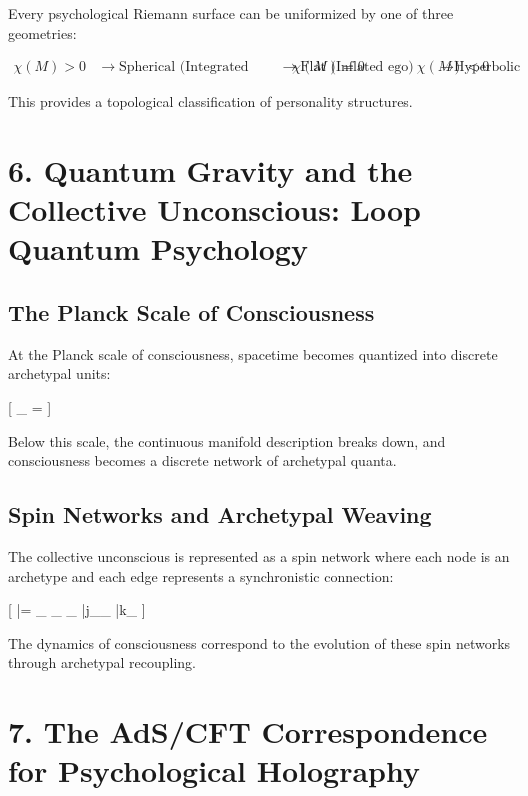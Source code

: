 \documentclass[12pt]{article}
\begin{document}
Every psychological Riemann surface can be uniformized by one of three geometries:

\begin{align}
\chi(M) > 0 &\rightarrow \text{Spherical (Integrated personality)} \
\chi(M) = 0 &\rightarrow \text{Flat (Inflated ego)} \
\chi(M) < 0 &\rightarrow \text{Hyperbolic (Neurotic fragmentation)}
\end{align}

This provides a topological classification of personality structures.

\section*{6. Quantum Gravity and the Collective Unconscious: Loop Quantum Psychology}

\subsection*{The Planck Scale of Consciousness}

At the Planck scale of consciousness, spacetime becomes quantized into discrete archetypal units:

[
\ell_{} =  \cdot {}
]

Below this scale, the continuous manifold description breaks down, and consciousness becomes a discrete network of archetypal quanta.

\subsection*{Spin Networks and Archetypal Weaving}

The collective unconscious is represented as a spin network where each node is an archetype and each edge represents a synchronistic connection:

[
|\rangle = \sum_{} \psi_{} \prod_{} |j_{}\rangle \prod_{} |k_{}\rangle
]

The dynamics of consciousness correspond to the evolution of these spin networks through archetypal recoupling.

\section*{7. The AdS/CFT Correspondence for Psychological Holography}
\end{document}
